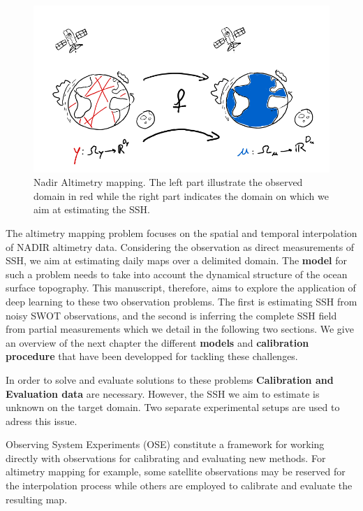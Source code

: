 \begin{bibunit}
\begin{figure}
    \centering
          \includegraphics[width=\linewidth]{Introduction/pics/mapping_task.png}
    \caption{Nadir Altimetry mapping. The left part illustrate the observed domain in red while the right part indicates the domain on which we aim at estimating the SSH.}
    \label{fig:mapping_task}
\end{figure}
The altimetry mapping problem focuses on the spatial and temporal interpolation of NADIR altimetry data. Considering the observation as direct measurements of SSH, we aim at estimating daily maps over a delimited domain. The \textbf{model} for such a problem needs to take into account the dynamical structure of the ocean surface topography.
This manuscript, therefore, aims to explore the application of deep learning to these two observation problems. The first is estimating SSH from noisy SWOT observations, and the second is inferring the complete SSH field from partial measurements which we detail in the following two sections.
We give an overview of the next chapter the different \textbf{models} and \textbf{calibration procedure} that have been developped for tackling these challenges.
  


In order to solve and evaluate solutions to these problems \textbf{Calibration and Evaluation data} are necessary. However, the SSH we aim to estimate is unknown on the target domain.
Two separate experimental setups are used to adress this issue.

Observing System Experiments (OSE)\cite{hamonImpactMultipleAltimeter2019} constitute a framework for working directly with observations for calibrating and evaluating new methods.
For altimetry mapping for example, some satellite observations may be reserved for the interpolation process while others are employed to calibrate and evaluate the resulting map.


\end{bibunit}
